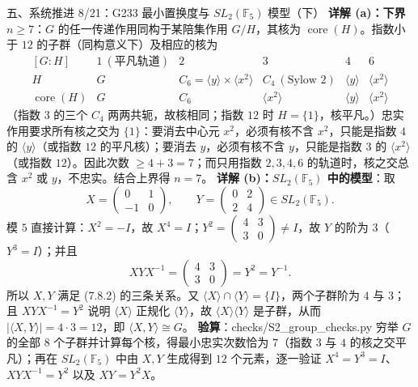 \documentclass[aspectratio=169,10pt,fontset=none]{ctexbeamer}
\newcommand{\key}[1]{\textcolor{ink}{\bfseries #1}}
\begin{document}
\begin{frame}[t]{五、系统推进 8/21：G233 最小置换度与 $SL_2(\mathbb F_5)$ 模型（下）}
\scriptsize
\key{详解 (a)：下界 $n\ge 7$}：$G$ 的任一传递作用同构于某陪集作用 $G/H$，其核为 $\operatorname{core}(H)$。指数小于 $12$ 的子群（同构意义下）及相应的核为
\[
\begin{array}{c|ccccc}
[G:H] & 1\ (\text{平凡轨道}) & 2 & 3 & 4 & 6\\ \hline
H & G & C_6=\langle y\rangle\times\langle x^2\rangle & C_4\ (\text{Sylow }2) & \langle y\rangle & \langle x^2\rangle\\
\operatorname{core}(H) & G & C_6 & \langle x^2\rangle & \langle y\rangle & \langle x^2\rangle
\end{array}
\]
（指数 $3$ 的三个 $C_4$ 两两共轭，故核相同；指数 $12$ 时 $H=\{1\}$，核平凡。）忠实作用要求所有核之交为 $\{1\}$：要消去中心元 $x^2$，必须有核不含 $x^2$，只能是指数 $4$ 的 $\langle y\rangle$（或指数 $12$ 的平凡核）；要消去 $y$，必须有核不含 $y$，只能是指数 $3$ 的 $\langle x^2\rangle$（或指数 $12$）。因此次数 $\ge 4+3=7$；而只用指数 $2,3,4,6$ 的轨道时，核之交总含 $x^2$ 或 $y$，不忠实。结合上界得 $n=7$。
\key{详解 (b)：$SL_2(\mathbb F_5)$ 中的模型}：取
\[ X=\begin{pmatrix}0&1\\-1&0\end{pmatrix},\qquad Y=\begin{pmatrix}0&2\\2&4\end{pmatrix}\in SL_2(\mathbb F_5). \]
模 $5$ 直接计算：$X^2=-I$，故 $X^4=I$；$Y^2=\begin{pmatrix}4&3\\3&0\end{pmatrix}\ne I$，故 $Y$ 的阶为 $3$（$Y^3=I$）；并且
\[ XYX^{-1}=\begin{pmatrix}4&3\\3&0\end{pmatrix}=Y^2=Y^{-1}. \]
所以 $X,Y$ 满足 (7.8.2) 的三条关系。又 $\langle X\rangle\cap\langle Y\rangle=\{I\}$，两个子群阶为 $4$ 与 $3$；且 $XYX^{-1}=Y^2$ 说明 $\langle X\rangle$ 正规化 $\langle Y\rangle$，故 $\langle X\rangle\langle Y\rangle$ 是子群，从而 $|\langle X,Y\rangle|=4\cdot3=12$，即 $\langle X,Y\rangle\cong G$。
\key{验算}：\textsf{checks/S2\_group\_checks.py} 穷举 $G$ 的全部 $8$ 个子群并计算每个核，得最小忠实次数恰为 $7$（指数 $3$ 与 $4$ 的核之交平凡）；再在 $SL_2(\mathbb F_5)$ 中由 $X,Y$ 生成得到 $12$ 个元素，逐一验证 $X^4=Y^3=I$、$XYX^{-1}=Y^2$ 以及 $XY=Y^2X$。
\end{frame}
\end{document}
